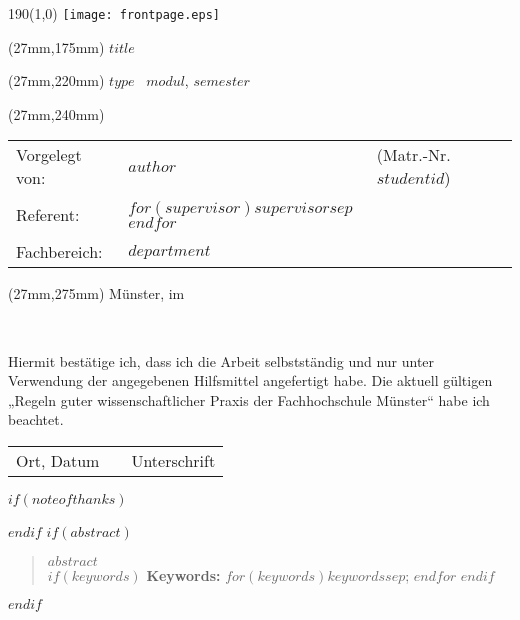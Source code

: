 \documentclass[11 pt,bibliography=totoc,listof=totoc]{scrreprt}
\begin{document}
\begin{titlepage}
\begin{textblock}{190}(1,0)
	\texttt{[image: frontpage.eps]}
\end{textblock}
\doublespacing
\begin{textblock*}{156mm}(27mm,175mm)
	\LARGE \textbf{$title$}
\end{textblock*}
\singlespacing
\begin{textblock*}{156mm}(27mm,220mm)
	\Large $type$ \ \textbf{$modul$}, $semester$
\end{textblock*}
\begin{textblock*}{156mm}(27mm,240mm)
	\normalsize
	\begin{tabularx}{120mm}{l X l}
		Vorgelegt von:&\textbf{$author$}&(Matr.-Nr. $studentid$)\\
		&&\\
		Referent:&\textbf{$for(supervisor)$$supervisor$$sep$ \newline $endfor$}\\
		&&\\
		Fachbereich:&\textbf{$department$}\\
	\end{tabularx}
\end{textblock*}
\begin{textblock*}{156mm}(27mm,275mm)
	Münster, im \makeatletter \month@ngerman \makeatother \ \the\year
\end{textblock*}
\end{titlepage}
\clearpage
\newpage
\mbox{~}
\clearpage
\newpage
\thispagestyle{empty}

\newpage
\thispagestyle{empty}
\vspace*{10mm}
\normalsize
\doublespacing
Hiermit bestätige ich, dass ich die Arbeit selbstständig und nur unter Verwendung der angegebenen Hilfsmittel angefertigt habe. Die aktuell gültigen „Regeln guter wissenschaftlicher Praxis der Fachhochschule Münster“ habe ich beachtet.
\vspace{20mm}
\hspace{-1cm}
\begin{table}[h]
	\centering
	\begin{tabular}{p{50mm}p{50mm}p{50mm}}
		Ort, Datum& &Unterschrift
	\end{tabular}
\end{table}
$if(noteofthanks)$
\newpage

$endif$
\newpage
\thispagestyle{empty}
\onehalfspacing
$if(abstract)$
\begin{abstract}
$abstract$\\
$if(keywords)$
\textbf{Keywords:} $for(keywords)$$keywords$$sep$; $endfor$
$endif$
\end{abstract}
$endif$
\end{document}
